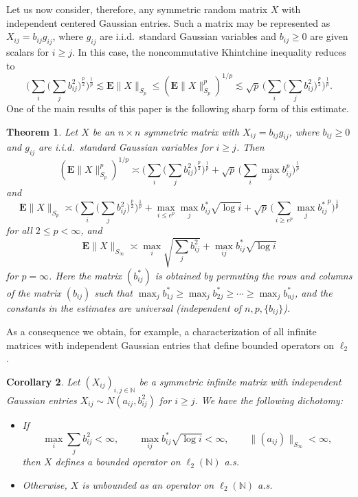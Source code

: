 \documentclass[10pt,reqno]{amsart}
\newtheorem{thm}{Theorem}[section]
\newtheorem{cor}[thm]{Corollary}
\theoremstyle{definition}
\numberwithin{equation}{section}
\numberwithin{figure}{section}
\numberwithin{table}{section}
\begin{document}
Let us now consider, therefore, any symmetric random matrix $X$ with 
independent centered Gaussian entries. Such a matrix may be 
represented as $X_{ij}=b_{ij}g_{ij}$, where $g_{ij}$ are i.i.d.\ standard 
Gaussian variables and $b_{ij}\ge 0$ are given scalars for $i\ge j$. In 
this case, the noncommutative Khintchine inequality reduces to
$$
	\Bigg(\sum_i\Bigg(\sum_j b_{ij}^2\Bigg)^{\frac{p}{2}}\Bigg)^{\frac{1}{p}}
	\lesssim \mathbf{E}\|X\|_{S_p} \le
	(\mathbf{E}\|X\|_{S_p}^p)^{1/p}
	\lesssim
	\sqrt{p}\,
	\Bigg(\sum_i\Bigg(\sum_j b_{ij}^2\Bigg)^{\frac{p}{2}}\Bigg)^{\frac{1}{p}}.
$$
One of the main results of this paper is the following sharp form 
of this estimate.

\begin{thm}
\label{thm:main}
Let $X$ be an $n\times n$ symmetric matrix with 
$X_{ij}=b_{ij}g_{ij}$, where $b_{ij}\ge 0$ and $g_{ij}$ are i.i.d.\ 
standard Gaussian variables for $i\ge j$. Then
$$
	(\mathbf{E}\|X\|_{S_p}^p)^{1/p} \asymp
	\Bigg(\sum_i\Bigg(\sum_j b_{ij}^2\Bigg)^{\frac{p}{2}}\Bigg)^{\frac{1}{p}}
	+ \sqrt{p}\,\Bigg(\sum_{i}\max_j b_{ij}^{p}\Bigg)^{\frac{1}{p}}
$$
and
$$
	\mathbf{E}\|X\|_{S_p} 
	\asymp
	\Bigg(\sum_i\Bigg(\sum_j b_{ij}^2\Bigg)^{\frac{p}{2}}\Bigg)^{\frac{1}{p}} +
	\max_{i\le e^p}\max_j b_{ij}^*\sqrt{\log i} +
	\sqrt{p}\,\Bigg(
	\sum_{i\ge e^p}\max_j {b_{ij}^{*}}^p
	\Bigg)^{\frac{1}{p}}
$$
for all $2\le p<\infty$, and
$$
	\mathbf{E}\|X\|_{S_\infty}
	\asymp
	\max_i\sqrt{\sum_j b_{ij}^2} + \max_{ij}b_{ij}^*\sqrt{\log i}
$$
for $p=\infty$.
Here the matrix $(b_{ij}^*)$ is obtained by permuting the rows and 
columns of the matrix $(b_{ij})$ such that
$\max_j b_{1j}^* \ge \max_j b_{2j}^* \ge \cdots \ge \max_j b_{nj}^*$,
and the constants in the estimates are universal \emph{(}independent
of $n,p,\{b_{ij}\}$\emph{)}.
\end{thm}

As a consequence we obtain, for example, a characterization of all 
infinite matrices with independent Gaussian entries that define bounded 
operators on $\ell_2$.

\begin{cor}
\label{cor:inf}
Let $(X_{ij})_{i,j\in\mathbb{N}}$ be a symmetric infinite matrix with 
independent Gaussian entries 
$X_{ij}\sim N(a_{ij},b_{ij}^2)$ for $i\ge j$. We have the following
dichotomy:
\begin{itemize}[label=\textbullet, leftmargin=*]
\itemsep\abovedisplayskip
\item If
$$
	\max_i\sum_j b_{ij}^2 <\infty,\qquad
	\max_{ij}b_{ij}^*\sqrt{\log i}<\infty,\qquad
	\|(a_{ij})\|_{S_\infty}<\infty,
$$
then $X$ defines a bounded operator on $\ell_2(\mathbb{N})$ a.s.
\item Otherwise, $X$ is unbounded as an operator on $\ell_2(\mathbb{N})$ 
a.s.
\end{itemize}
\end{cor}
\end{document}
